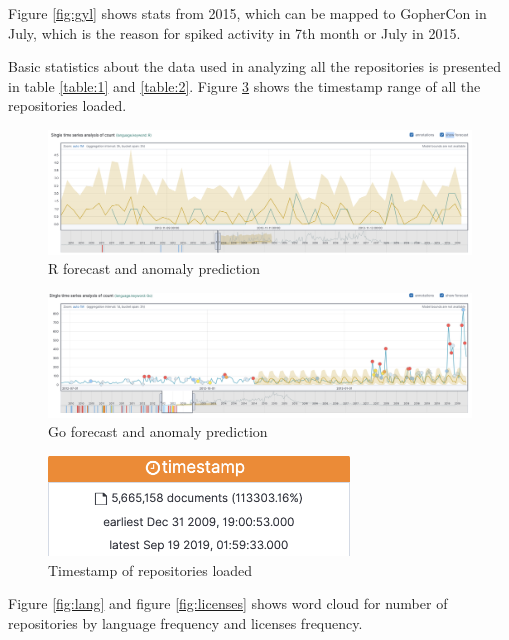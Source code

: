 \documentclass[12pt,conference]{IEEEtran}
\begin{document}
Figure \ref{fig:gyl} shows stats from 2015, which can be mapped to GopherCon in July, which is the reason for spiked activity in 7th month or July in 2015. 

Basic statistics about the data used in analyzing all the repositories is presented in table \ref{table:1} and \ref{table:2}. Figure \ref{fig:torl} shows the timestamp range of all the repositories loaded. 

\begin{figure}[ht]
  \centering
  \includegraphics[width=16cm]{actualvspredictedR.png}
  \caption{R forecast and anomaly prediction}
  \label{fig:rfc}
\end{figure}

\begin{figure}[ht]
  \centering
  \includegraphics[width=16cm]{anomalygo.png}
  \caption{Go forecast and anomaly prediction}
  \label{fig:gfc}
\end{figure}

\begin{figure}[h]
  \centering
  \includegraphics[width=8cm]{tsteposdata.png}
  \caption{Timestamp of repositories loaded}
  \label{fig:torl}
\end{figure}

Figure \ref{fig:lang} and figure \ref{fig:licenses} shows word cloud for number of repositories by language frequency and licenses frequency. 
\end{document}
